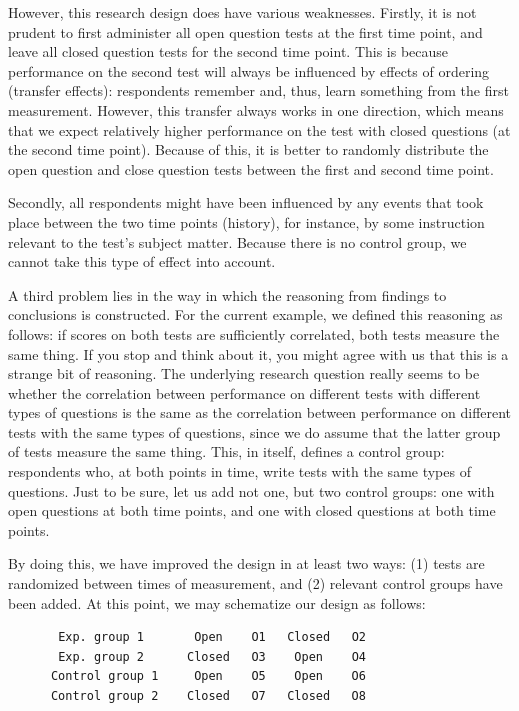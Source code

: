 \documentclass[
]{book}
\begin{document}
However, this research design does have various weaknesses. Firstly, it is not prudent to first administer all open question tests at the first time point, and leave all closed question tests for the second time point. This is because performance on the second test will always be influenced by effects of ordering (transfer effects): respondents remember and, thus, learn something from the first measurement. However, this transfer always works in one direction, which means that we expect relatively higher performance on the test with closed questions (at the second time point). Because of this, it is better to randomly distribute the open question and close question tests between the first and second time point.

Secondly, all respondents might have been influenced by any events that took place between the two time points (history), for instance, by some instruction relevant to the test's subject matter. Because there is no control group, we cannot take this type of effect into account.

A third problem lies in the way in which the reasoning from findings to conclusions is constructed. For the current example, we defined this reasoning as follows: if scores on both tests are sufficiently correlated, both tests measure the same thing. If you stop and think about it, you might agree with us that this is a strange bit of reasoning. The underlying research question really seems to be whether the correlation between performance on different tests with different types of questions is the same as the correlation between performance on different tests with the same types of questions, since we do assume that the latter group of tests measure the same thing. This, in itself, defines a control group: respondents who, at both points in time, write tests with the same types of questions. Just to be sure, let us add not one, but two control groups: one with open questions at both time points, and one with closed questions at both time points.

By doing this, we have improved the design in at least two ways: (1) tests are randomized between times of measurement, and (2) relevant control groups have been added. At this point, we may schematize our design as follows:

\begin{verbatim}
       Exp. group 1       Open    O1   Closed   O2
       Exp. group 2      Closed   O3    Open    O4
      Control group 1     Open    O5    Open    O6
      Control group 2    Closed   O7   Closed   O8
\end{verbatim}
\end{document}
